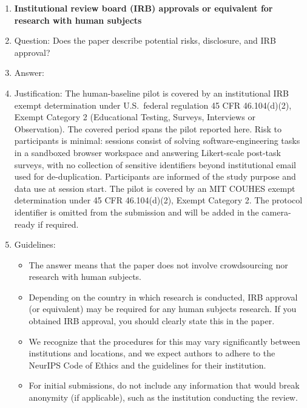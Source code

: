 \begin{enumerate}
\item {\bf Institutional review board (IRB) approvals or equivalent for research with human subjects}
    \item[] Question: Does the paper describe potential risks, disclosure, and IRB approval?
    \item[] Answer: \answerYes{}
    \item[] Justification: The human-baseline pilot is covered by an institutional IRB exempt determination under U.S.\ federal regulation 45 CFR 46.104(d)(2), Exempt Category 2 (Educational Testing, Surveys, Interviews or Observation). The covered period spans the pilot reported here. Risk to participants is minimal: sessions consist of solving software-engineering tasks in a sandboxed browser workspace and answering Likert-scale post-task surveys, with no collection of sensitive identifiers beyond institutional email used for de-duplication. Participants are informed of the study purpose and data use at session start. The pilot is covered by an MIT COUHES exempt determination under 45 CFR 46.104(d)(2), Exempt Category 2. The protocol identifier is omitted from the submission and will be added in the camera-ready if required.
    \item[] Guidelines:
    \begin{itemize}
        \item The answer \answerNA{} means that the paper does not involve crowdsourcing nor research with human subjects.
        \item Depending on the country in which research is conducted, IRB approval (or equivalent) may be required for any human subjects research. If you obtained IRB approval, you should clearly state this in the paper. 
        \item We recognize that the procedures for this may vary significantly between institutions and locations, and we expect authors to adhere to the NeurIPS Code of Ethics and the guidelines for their institution. 
        \item For initial submissions, do not include any information that would break anonymity (if applicable), such as the institution conducting the review.
    \end{itemize}


\end{enumerate}
